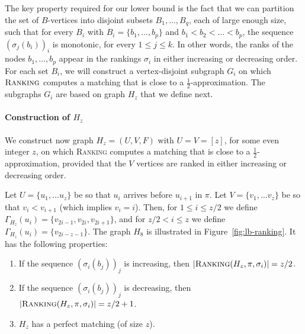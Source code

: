 \documentclass[a4paper]{article}
\newcommand{\Rank}{\textsc{Ranking}}
\begin{document}
The key property required for our lower bound is the fact that we can partition the set of $B$-vertices
into disjoint subsets $B_1, \dots, B_q$, each of large enough size, such that for every
$B_i$ with $B_i = \{b_1, \dots, b_p \}$ and $b_1 < b_2 < \dots < b_p$, the sequence $(\sigma_j(b_i))_i$ is
monotonic, for every $1 \le j \le k$. In other words, the ranks of the nodes $b_1, \dots, b_p$ appear
in the rankings $\sigma_i$ in either increasing or decreasing order. For each set $B_i$,
we will construct a vertex-disjoint subgraph $G_i$ on which $\Rank$ computes a matching that is close to
a $\frac{1}{2}$-approximation. The subgraphs $G_i$ are based on graph $H_z$ that we define next.

\paragraph*{Construction of $H_z$}
We construct now graph $H_z = (U, V, F)$ with $U = V = [z]$, for some even integer $z$,
on which {\Rank} computes a matching that is close to a $\frac{1}{2}$-approximation, provided that the $V$
vertices are ranked in either increasing or decreasing order.

Let $U = \{u_1, \dots u_z \}$ be so that $u_i$ arrives before $u_{i+1}$ in $\pi$.
Let $V = \{v_1, \dots v_z \}$ be so that $v_i < v_{i+1}$ (which implies $v_i = i$). Then, for $1 \le i \le z/2$
we define $\Gamma_{H_z}(u_i) = \{v_{2i-1}, v_{2i}, v_{2i+1} \}$, and for $z/2 < i \le z$
we define $\Gamma_{H_z}(u_i) = \{ v_{2i-z-1} \}$.
The graph $H_8$ is illustrated in Figure~\ref{fig:lb-ranking}. It has the following properties:
\begin{enumerate}
 \item If the sequence $(\sigma_i(b_j))_j$ is increasing, then $|\Rank(H_z, \pi, \sigma_i)| = z/2$.
 \item If the sequence $(\sigma_i(b_j))_j$ is decreasing, then $|\Rank(H_z, \pi, \sigma_i)| = z/2+1$.
 \item $H_z$ has a perfect matching (of size $z$).
\end{enumerate}
\end{document}

